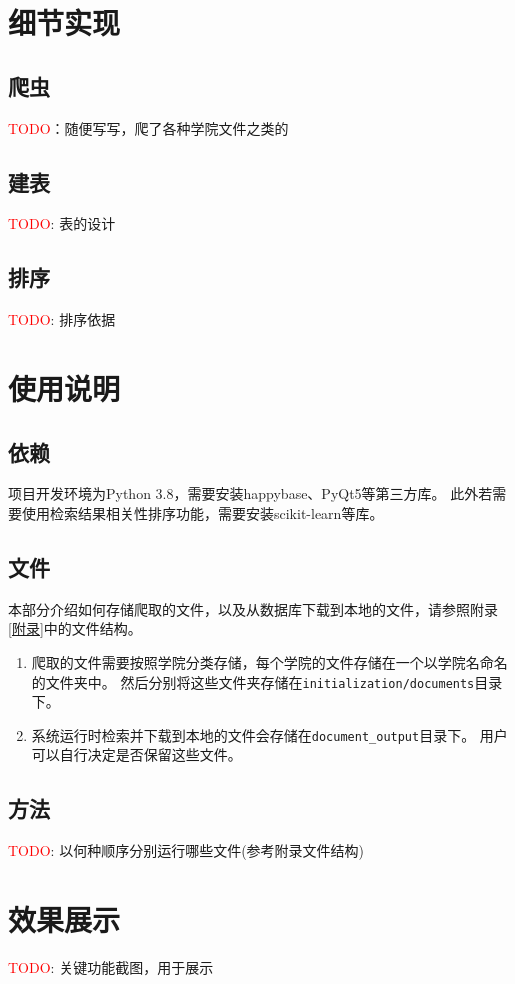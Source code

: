 \documentclass{article}
\begin{document}
	\section{细节实现}
	\subsection{爬虫}
	\textcolor{red}{TODO}：随便写写，爬了各种学院文件之类的
	\subsection{建表}
	\textcolor{red}{TODO}: 表的设计
	\subsection{排序}
	\textcolor{red}{TODO}: 排序依据
	
	\section{使用说明}
	\subsection{依赖}
	项目开发环境为Python 3.8，需要安装happybase、PyQt5等第三方库。
	此外若需要使用检索结果相关性排序功能，需要安装scikit-learn等库。
	
	\subsection{文件}
	本部分介绍如何存储爬取的文件，以及从数据库下载到本地的文件，请参照附录\ref{附录}中的文件结构。
		\begin{enumerate}
			\item
			爬取的文件需要按照学院分类存储，每个学院的文件存储在一个以学院名命名的文件夹中。
			然后分别将这些文件夹存储在\texttt{initialization/documents}目录下。
			\item
			系统运行时检索并下载到本地的文件会存储在\texttt{document\_output}目录下。
			用户可以自行决定是否保留这些文件。
		\end{enumerate}
	
	\subsection{方法}
	\textcolor{red}{TODO}: 以何种顺序分别运行哪些文件(参考附录文件结构)
	
	\section{效果展示}
	\textcolor{red}{TODO}: 关键功能截图，用于展示
\end{document}
